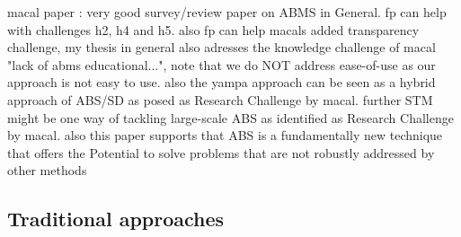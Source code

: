 macal paper \cite{macal_everything_2016}: very good survey/review paper on ABMS in General. fp can help with challenges h2, h4 and h5. also fp can help macals added transparency challenge, my thesis in general also adresses the knowledge challenge of macal "lack of abms educational...", note that we do NOT address ease-of-use as our approach is not easy to use. also the yampa approach can be seen as a hybrid approach of ABS/SD as posed as Research Challenge by macal. further STM might be one way of tackling large-scale ABS as identified as Research Challenge by macal. also this paper supports that ABS is a fundamentally new technique that offers the Potential to solve problems that are not robustly addressed by other methods

\subsection{Traditional approaches}
